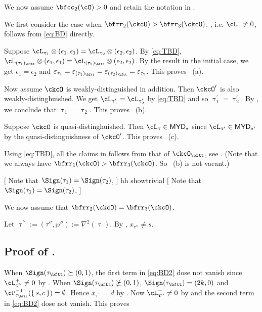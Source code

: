 \documentclass[12pt,a4paper]{amsart}
\newcommand{\trivial}[2][]{\if\relax\detokenize{#1}\relax
  {%
      \color{orange} \vspace{0em} $[$  #2 $]$
      \color{black}
  }
  \else
\ifx#1h
\ifcsname showtrivial\endcsname
{%
    \color{orange} \vspace{0em}  $[$ #2 $]$
    \color{black}
}
\fi
\else {\red Wrong argument!} \fi
\fi
}
\newcommand{\AC}{\mathrm{AC}}
\def\MYD{{\mathsf{MYD}}}
\def\DD{\nabla}
\numberwithin{equation}{section}
\theoremstyle{remark}
\def\uptaup{\uptau^{\prime}}
\def\uptaupp{\uptau^{\prime\prime}}
\begin{document}
\medskip

We now assume $\bfcc_{2}(\cO)>0$ and retain the notation in .

We first consider the case when $\bfrr_{2}(\ckcO)>\bfrr_{3}(\ckcO)$.
, i.e. $\ac_{\uptau}\neq 0$, follows from \eqref{eq:BD} directly.

Suppose $\ac_{\uptau_1}\lotimes (\epsilon_{1},\epsilon_{1})
= \ac_{\uptau_2}\lotimes( \epsilon_{2},\epsilon_{2} )$.
By \eqref{eq:TBD},
$\cL_{(\tau_{1})_{\bftt}}\lotimes(\epsilon_{1},\epsilon_{1}) =
\cL_{(\tau_{2})_{\bftt}}\lotimes(\epsilon_{2},\epsilon_{2})$.
By the result in the initial case, we get $\epsilon_{1}=\epsilon_{2}$ and
$\varepsilon_{\tau_{1}}=\varepsilon_{(\tau_{1})_{\bftt}}=\varepsilon_{(\tau_{2})_{\bftt}}=\varepsilon_{\tau_{2}}$.
This proves ~(a).

\smallskip

Now assume $\ckcO$ is weakly-distinguished in addition. Then $\ckcO'$ is also
weakly-distinghuished.
We get $\ac_{\uptaup_{1}}=\ac_{\uptaup_{2}}$ by \eqref{eq:TBD} and so $\uptaup_{1}=\uptaup_{2}$.
By , we conclude that $\uptau_{1}=\uptau_{2}$. This proves
~(b).


\smallskip

Suppose $\ckcO$ is quasi-distinghuished. Then $\ac_{\uptau}\in \MYD_{\star}$
since $\ac_{\uptau'}\in \MYD_{\star'}$ by the quasi-distinguishness of
$\ckcO'$.
This proves ~(c).


\smallskip

Using \eqref{eq:TBD}, all the claims in  follows from that of
$\ckcO_{\bftt}$, see . (Note that we always have
$\bfrr_{1}(\ckcO)>\bfrr_{3}(\ckcO)$. So ~(b) is not vacant.)

\trivial[h]{
Note that $\Sign(\tau_{1})=\Sign(\tau_{2})$,
}

\medskip


We now assume that $\bfrr_{2}(\ckcO)=\bfrr_{3}(\ckcO)$.

Let $\uptaupp :=(\tau'',\wp''):= \DD^{2}(\uptau)$.
By , $x_{\tau''}\neq s$.


\subsection*{\bf Proof of . }
When $\Sign(\tau_{\bftt})\succeq (0,1)$, the first term in \eqref{eq:BD2} dose
not vanish since $\pac{\uptaupp}\neq 0$ by .
When $\Sign(\tau_{\bftt})\nsucceq (0,1)$, $\Sign(\tau_{\bftt}) = (2k,0)$ and
$\cP_{\tau_{\bftt}}^{-1}(\set{s,c})=\emptyset$. Hence
  $x_{\uptaupp}=d$ by . Now $\nac{\uptaupp} \neq 0$ by
   and
  the second term in \eqref{eq:BD2} dose not vanish.
This proves 
\end{document}
